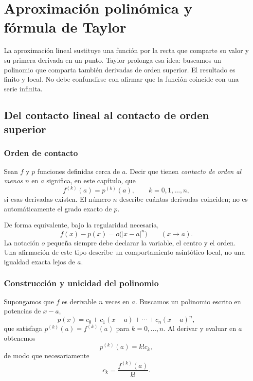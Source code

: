 \chapter[Aproximación de Taylor]{Aproximación polinómica y fórmula de Taylor}
\label{chap:taylor}

La aproximación lineal sustituye una función por la recta que comparte su
valor y su primera derivada en un punto. Taylor prolonga esa idea: buscamos un
polinomio que comparta también derivadas de orden superior. El resultado es
finito y local. No debe confundirse con afirmar que la función coincide con
una serie infinita.

\section{Del contacto lineal al contacto de orden superior}
\label{sec:contacto-taylor}

\subsection{Orden de contacto}

Sean \(f\) y \(p\) funciones definidas cerca de \(a\). Decir que tienen
\emph{contacto de orden al menos \(n\)} en \(a\) significa, en este capítulo,
que
\[
  f^{(k)}(a)=p^{(k)}(a),
  \qquad k=0,1,\dots,n,
\]
si esas derivadas existen. El número \(n\) describe cuántas derivadas
coinciden; no es automáticamente el grado exacto de \(p\).

De forma equivalente, bajo la regularidad necesaria,
\[
  f(x)-p(x)=o\bigl(|x-a|^n\bigr)
  \qquad (x\to a).
\]
La notación \(o\) pequeña siempre debe declarar la variable, el centro y el
orden. Una afirmación de este tipo describe un comportamiento asintótico
local, no una igualdad exacta lejos de \(a\).

\subsection{Construcción y unicidad del polinomio}

Supongamos que \(f\) es derivable \(n\) veces en \(a\). Buscamos un polinomio
escrito en potencias de \(x-a\),
\[
  p(x)=c_0+c_1(x-a)+\cdots+c_n(x-a)^n,
\]
que satisfaga \(p^{(k)}(a)=f^{(k)}(a)\) para \(k=0,\dots,n\). Al derivar y
evaluar en \(a\) obtenemos
\[
  p^{(k)}(a)=k!c_k,
\]
de modo que necesariamente
\[
  c_k=\frac{f^{(k)}(a)}{k!}.
\]

